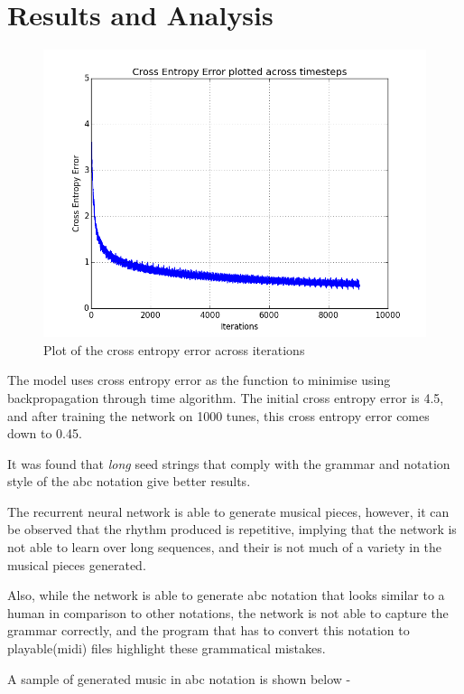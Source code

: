 \documentclass[11pt]{article}
\begin{document}
\section{Results and Analysis}


\begin{figure}
  \includegraphics[width=\linewidth]{graph.png}
  \caption{Plot of the cross entropy error across iterations}
  \label{fig:graph}
\end{figure}

The model uses cross entropy error as the function to minimise using backpropagation through time algorithm. The initial cross entropy error is 4.5, and after training the network on 1000 tunes, this cross entropy error comes down to 0.45.

It was found that \emph{long} seed strings that comply with the grammar and notation style of the abc notation give better results.

The recurrent neural network is able to generate musical pieces, however, it can be observed that the rhythm produced is repetitive, implying that the network is not able to learn over long sequences, and their is not much of a variety in the musical pieces generated.

Also, while the network is able to generate abc notation that looks similar to a human in comparison to other notations, the network is not able to capture the grammar correctly, and the program that has to convert this notation to playable(midi) files highlight these grammatical mistakes.

A sample of generated music in abc notation is shown below - 
\end{document}
